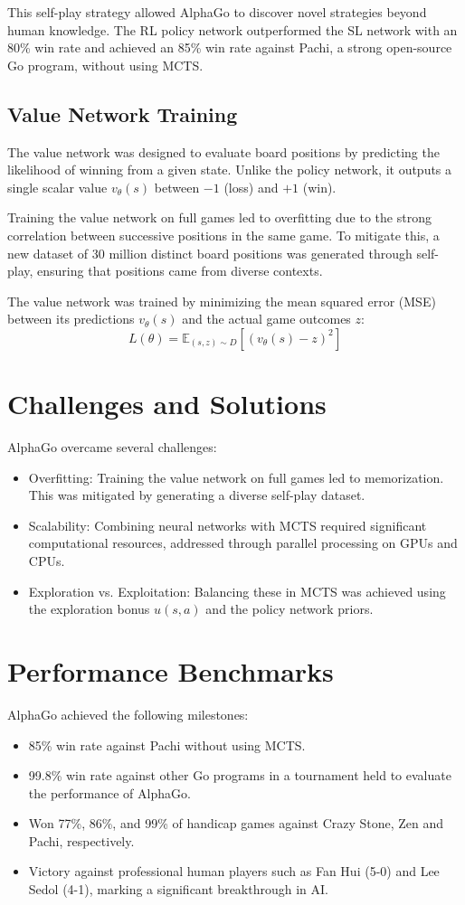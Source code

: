 This self-play strategy allowed AlphaGo to discover novel strategies beyond human knowledge. The RL policy network outperformed the SL network with an 80\% win rate and achieved an 85\% win rate against Pachi, a strong open-source Go program, without using MCTS.

\subsection{Value Network Training}
The value network was designed to evaluate board positions by predicting the likelihood of winning from a given state. Unlike the policy network, it outputs a single scalar value \( v_\theta(s) \) between \(-1\) (loss) and \(+1\) (win).

Training the value network on full games led to overfitting due to the strong correlation between successive positions in the same game. To mitigate this, a new dataset of 30 million distinct board positions was generated through self-play, ensuring that positions came from diverse contexts.

The value network was trained by minimizing the mean squared error (MSE) between its predictions \( v_\theta(s) \) and the actual game outcomes \( z \):
\[
L(\theta) = \mathbb{E}_{(s, z) \sim D} \left[ (v_\theta(s) - z)^2 \right]
\]
\section{Challenges and Solutions}
AlphaGo overcame several challenges:
\begin{itemize}
    \item Overfitting: Training the value network on full games led to memorization. This was mitigated by generating a diverse self-play dataset.
    \item Scalability: Combining neural networks with MCTS required significant computational resources, addressed through parallel processing on GPUs and CPUs.
    \item Exploration vs. Exploitation: Balancing these in MCTS was achieved using the exploration bonus \( u(s, a) \) and the policy network priors.
\end{itemize}

\section{Performance Benchmarks}
AlphaGo achieved the following milestones:
\begin{itemize}
    \item 85\% win rate against Pachi without using MCTS.
    \item 99.8\% win rate against other Go programs in a tournament held to evaluate the performance of AlphaGo.
    \item Won 77\%, 86\%, and 99\% of handicap games against Crazy Stone, Zen and Pachi, respectively.
    \item Victory against professional human players such as Fan Hui (5-0) and Lee Sedol (4-1), marking a significant breakthrough in AI.
\end{itemize}
